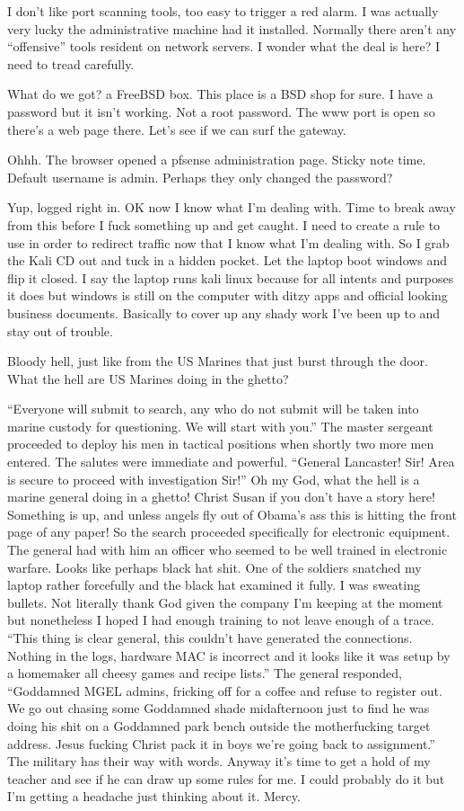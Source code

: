 I don't like port scanning tools, too easy to trigger a red alarm. I was actually very lucky the administrative machine had it installed. Normally there aren't any ``offensive'' tools resident on network servers. I wonder what the deal is here? I need to tread carefully.

What do we got? a FreeBSD box. This place is a BSD shop for sure. I have a password but it isn't working. Not a root password. The www port is open so there's a web page there. Let's see if we can surf the gateway.

Ohhh. The browser opened a pfsense administration page. Sticky note time. Default username is admin. Perhaps they only changed the password?

Yup, logged right in. OK now I know what I'm dealing with. Time to break away from this before I fuck something up and get caught. I need to create a rule to use in order to redirect traffic now that I know what I'm dealing with. So I grab the Kali CD out and tuck in a hidden pocket. Let the laptop boot windows and flip it closed. I say the laptop runs kali linux because for all intents and purposes it does but windows is still on the computer with ditzy apps and official looking business documents. Basically to cover up any shady work I've been up to and stay out of trouble.

Bloody hell, just like from the US Marines that just burst through the door. What the hell are US Marines doing in the ghetto?

``Everyone will submit to search, any who do not submit will be taken into marine custody for questioning. We will start with you.''
The master sergeant proceeded to deploy his men in tactical positions when shortly two more men entered. The salutes were immediate and powerful.
``General Lancaster! Sir! Area is secure to proceed with investigation Sir!''
Oh my God, what the hell is a marine general doing in a ghetto! Christ Susan if you don't have a story here! Something is up, and unless angels fly out of Obama's ass this is hitting the front page of any paper! So the search proceeded specifically for electronic equipment. The general had with him an officer who seemed to be well trained in electronic warfare. Looks like perhaps black hat shit. One of the soldiers snatched my laptop rather forcefully and the black hat examined it fully. I was sweating bullets. Not literally thank God given the company I'm keeping at the moment but nonetheless I hoped I had enough training to not leave enough of a trace.
``This thing is clear general, this couldn't have generated the connections. Nothing in the logs, hardware MAC is incorrect and it looks like it was setup by a homemaker all cheesy games and recipe lists.''
The general responded, ``Goddamned MGEL admins, fricking off for a coffee and refuse to register out. We go out chasing some Goddamned shade midafternoon just to find he was doing his shit on a Goddamned park bench outside the motherfucking target address. Jesus fucking Christ pack it in boys we're going back to assignment.''
The military has their way with words. Anyway it's time to get a hold of my teacher and see if he can draw up some rules for me. I could probably do it but I'm getting a headache just thinking about it. Mercy.

